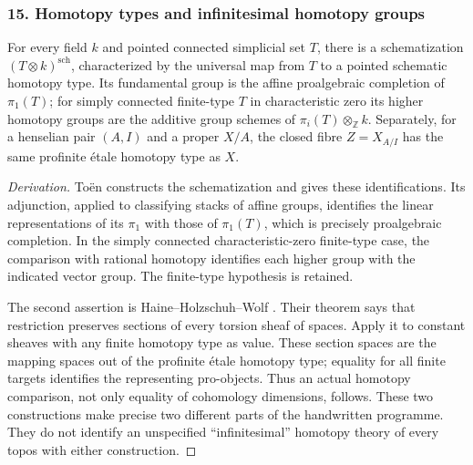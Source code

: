 \subsubsection{15. Homotopy types and infinitesimal homotopy groups}
\begin{theorem}\label{B:subject15}
For every field $k$ and pointed connected simplicial set $T$, there is a schematization $(T\otimes k)^{\mathrm{sch}}$, characterized by the universal map from $T$ to a pointed schematic homotopy type. Its fundamental group is the affine proalgebraic completion of $\pi_1(T)$; for simply connected finite-type $T$ in characteristic zero its higher homotopy groups are the additive group schemes of $\pi_i(T)\otimes_{\mathbb Z}k$. Separately, for a henselian pair $(A,I)$ and a proper $X/A$, the closed fibre $Z=X_{A/I}$ has the same profinite \'etale homotopy type as $X$.
\end{theorem}
\begin{proof}[Derivation]
To\"en \cite[Theorem 3.3.4 and Corollaries 3.3.7, 3.3.9]{BToen2006} constructs the schematization and gives these identifications. Its adjunction, applied to classifying stacks of affine groups, identifies the linear representations of its $\pi_1$ with those of $\pi_1(T)$, which is precisely proalgebraic completion. In the simply connected characteristic-zero finite-type case, the comparison with rational homotopy identifies each higher group with the indicated vector group. The finite-type hypothesis is retained.

The second assertion is Haine--Holzschuh--Wolf \cite[Corollary 2.34]{BHHW2024}. Their theorem says that restriction preserves sections of every torsion sheaf of spaces. Apply it to constant sheaves with any finite homotopy type as value. These section spaces are the mapping spaces out of the profinite \'etale homotopy type; equality for all finite targets identifies the representing pro-objects. Thus an actual homotopy comparison, not only equality of cohomology dimensions, follows. These two constructions make precise two different parts of the handwritten programme. They do not identify an unspecified ``infinitesimal'' homotopy theory of every topos with either construction.
\end{proof}

